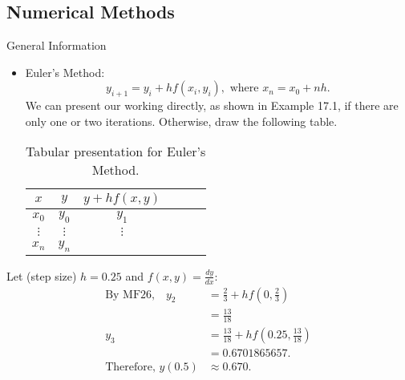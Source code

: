 \documentclass[oneside]{book}
\begin{document}
\subsection{Numerical Methods}
\begin{stbox}{General Information}
  \begin{itemize}
    \item Euler's Method: 
    \[y_{i+1}=y_i+hf(x_i,y_i),\text{ where }x_n=x_0+nh.\]
    We can present our working directly, as shown in Example 17.1, if there are only one or two iterations. Otherwise, draw the following table.
    \begin{table}[H]
      \centering
      \begin{tabular}{|Sc|Sc|Sc|}
        \hline
        \(x\) & \(y\) & \(y+hf(x,y)\)\\
        \hline
        \(x_0\)& \(y_0\) & \(y_1\)\\
        \hline
        \(\vdots\) & \(\vdots\) & \(\vdots\)\\
        \hline
        \(x_n\) & \(y_n\) &\\
        \hline
      \end{tabular}
      \caption{Tabular presentation for Euler's Method.}
      \label{table:euler-presentation}
    \end{table}
  \end{itemize}
\end{stbox}
    \begin{example}{}{}
      Let (step size) \(h=0.25\) and \(f(x,y)=\frac{dy}{dx}\):
      \begin{align*}
        \text{By MF26,}\quad y_2&=\frac{2}{3}+hf\left(0,\frac{2}{3}\right)\\
        &=\frac{13}{18}\\[3mm]
        y_3&=\frac{13}{18}+hf\left(0.25,\frac{13}{18}\right)\\
        &=0.6701865657.\\[3mm]
        \text{Therefore, }y(0.5)&\approx 0.670.
      \end{align*}
    \end{example}
\end{document}
